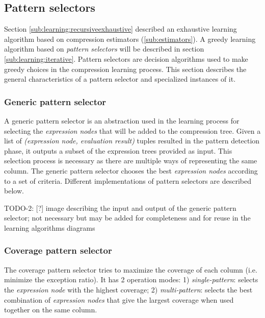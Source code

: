 \subsection{Pattern selectors}
\label{sub:learning:selectors}




% 

Section \ref{sub:learning:recursiveexhaustive} described an exhaustive learning algorithm based on compression estimators (\ref{sub:estimators}). A greedy learning algorithm based on \emph{pattern selectors} will be described in section \ref{sub:learning:iterative}. Pattern selectors are decision algorithms used to make greedy choices in the compression learning process. This section describes the general characteristics of a pattern selector and specialized instances of it.

\subsubsection{Generic pattern selector}
\label{subsubsec:ps:generic}

A generic pattern selector is an abstraction used in the learning process for selecting the \textit{expression nodes} that will be added to the compression tree. Given a list of \textit{(expression node, evaluation result)} tuples resulted in the pattern detection phase, it outputs a subset of the expression trees provided as input. This selection process is necessary as there are multiple ways of representing the same column. The generic pattern selector chooses the best \textit{expression nodes} according to a set of criteria. Different implementations of pattern selectors are described below.

TODO-2: [?] image describing the input and output of the generic pattern selector; not necessary but may be added for completeness and for reuse in the learning algorithms diagrams

\subsubsection{Coverage pattern selector}
\label{subsubsec:ps:coverage}

The coverage pattern selector tries to maximize the coverage of each column (i.e. minimize the exception ratio). It has 2 operation modes: 1) \textit{single-pattern}: selects the \textit{expression node} with the highest coverage; 2) \textit{multi-pattern}: selects the best combination of \textit{expression nodes} that give the largest coverage when used together on the same column.

